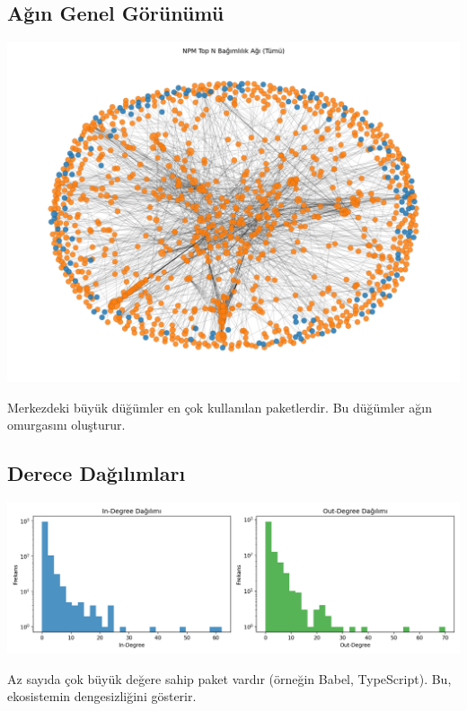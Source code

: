 \documentclass[11pt,a4paper]{article}
\begin{document}
\subsection{Ağın Genel Görünümü}
\includegraphics{network_full_topN.png}
\begin{tipbox}
Merkezdeki büyük düğümler en çok kullanılan paketlerdir. Bu düğümler ağın omurgasını oluşturur.
\end{tipbox}

\subsection{Derece Dağılımları}
\includegraphics{degree_histograms.png}
\begin{tipbox}
Az sayıda çok büyük değere sahip paket vardır (örneğin Babel, TypeScript). Bu, ekosistemin dengesizliğini gösterir.
\end{tipbox}
\end{document}
